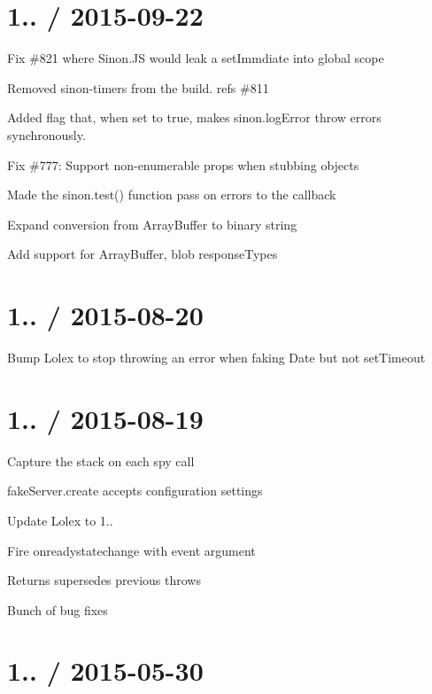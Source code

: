 \section*{1.. / 2015-\/09-\/22 }


\begin{DoxyItemize}
\item Fix \#821 where Sinon.\+JS would leak a set\+Immdiate into global scope
\item Removed sinon-\/timers from the build. refs \#811
\item Added flag that, when set to true, makes sinon.\+log\+Error throw errors synchronously.
\item Fix \#777\+: Support non-\/enumerable props when stubbing objects
\item Made the sinon.\+test() function pass on errors to the callback
\item Expand conversion from Array\+Buffer to binary string
\item Add support for Array\+Buffer, blob response\+Types
\end{DoxyItemize}

\section*{1.. / 2015-\/08-\/20 }


\begin{DoxyItemize}
\item Bump Lolex to stop throwing an error when faking Date but not set\+Timeout
\end{DoxyItemize}

\section*{1.. / 2015-\/08-\/19 }


\begin{DoxyItemize}
\item Capture the stack on each spy call
\item fake\+Server.\+create accepts configuration settings
\item Update Lolex to 1..
\item Fire onreadystatechange with event argument
\item Returns supersedes previous throws
\item Bunch of bug fixes
\end{DoxyItemize}

\section*{1.. / 2015-\/05-\/30 }


